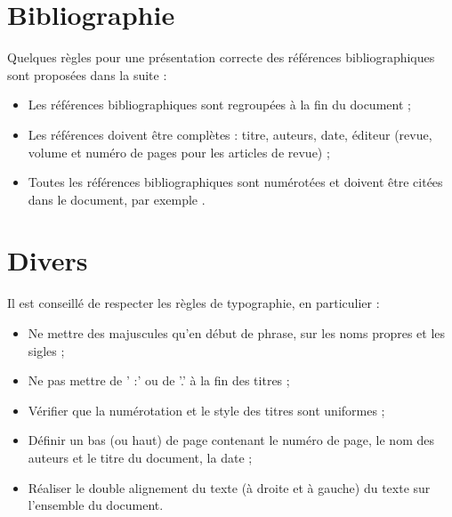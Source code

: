 \vspace{1cm}

\section*{Bibliographie}
Quelques règles pour une présentation correcte des références bibliographiques sont proposées dans la suite :
\begin{itemize}
	\item Les références bibliographiques sont regroupées à la fin du document ;
	\item Les références doivent être complètes : titre, auteurs, date, éditeur (revue, volume et numéro de pages pour les articles de revue) ;
	\item Toutes les références bibliographiques sont numérotées et doivent être citées dans le document, par exemple \cite{robo}.
\end{itemize}

\section*{Divers}
Il est conseillé de respecter les règles de typographie, en particulier :
\begin{itemize}
	\item Ne mettre des majuscules qu’en début de phrase, sur les noms propres et les sigles ;
	\item Ne pas mettre de ’ :’ ou de ’.’ à la fin des titres ;
	\item Vérifier que la numérotation et le style des titres sont uniformes ;
	\item Définir un bas (ou haut) de page contenant le numéro de page, le nom des auteurs et le titre du document, la date ;
	\item Réaliser le double alignement du texte (à droite et à gauche) du texte sur l’ensemble du document.
\end{itemize}
